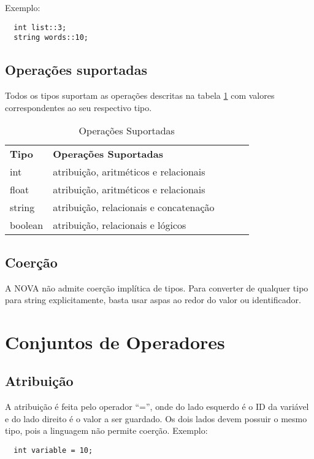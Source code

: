 \documentclass[a4paper, 12pt, article]{memoir}
\begin{document}
Exemplo:
\begin{lstlisting}
  int list::3;
  string words::10;
\end{lstlisting}

\subsection{Operações suportadas}
\label{operacoes_suport}

Todos os tipos suportam as operações descritas na tabela \ref{operacoes_table} com  valores correspondentes ao seu respectivo tipo.

\begin{table}[]
\centering
\caption{Operações Suportadas}
\label{operacoes_table}
\begin{tabular}{lllll}
\textbf{Tipo}   & \textbf{Operações Suportadas}                  &  &  &  \\
int    & atribuição, aritméticos e relacionais  &  &  &  \\
float  & atribuição, aritméticos e relacionais  &  &  &  \\
string & atribuição, relacionais e concatenação &  &  & \\
boolean & atribuição, relacionais e lógicos
\end{tabular}
\end{table}

\subsection{Coerção}

A NOVA não admite coerção implítica de tipos. Para converter de qualquer tipo para string explicitamente, basta usar aspas ao redor do valor ou identificador.

\section{Conjuntos de Operadores}
\label{sec:operadores}

\subsection{Atribuição}
\label{subsec:atribuicao}
A atribuição é feita pelo operador ``='', onde do lado esquerdo é o ID da variável e do lado direito é o valor a ser
guardado. Os dois lados devem possuir o mesmo tipo, pois a linguagem não permite coerção.
Exemplo:
\begin{lstlisting}
  int variable = 10;
\end{lstlisting}
\end{document}
